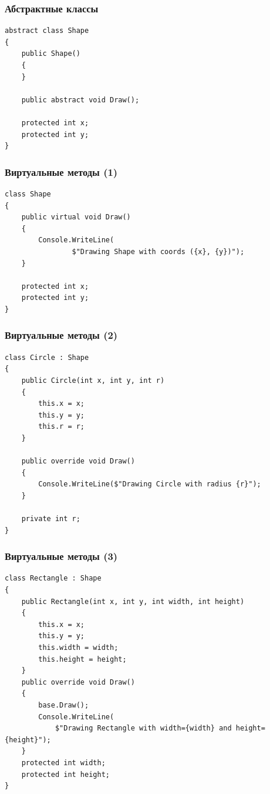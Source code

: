 \documentclass[xetex,mathserif,serif]{beamer}
\begin{document}
    \begin{frame}[fragile]
        \frametitle{Абстрактные классы}
        \begin{verbatim}
abstract class Shape
{
    public Shape() 
    {
    }

    public abstract void Draw();

    protected int x;
    protected int y;
}
        \end{verbatim}
    \end{frame}

    \begin{frame}[fragile]
        \frametitle{Виртуальные методы (1)}
        \begin{verbatim}
class Shape
{
    public virtual void Draw()
    {
        Console.WriteLine(
                $"Drawing Shape with coords ({x}, {y})");
    }

    protected int x;
    protected int y;
}
        \end{verbatim}
    \end{frame}

    \begin{frame}[fragile]
        \frametitle{Виртуальные методы (2)}
        \begin{verbatim}
class Circle : Shape
{
    public Circle(int x, int y, int r)
    {
        this.x = x;
        this.y = y;
        this.r = r;
    }

    public override void Draw()
    {
        Console.WriteLine($"Drawing Circle with radius {r}");
    }

    private int r;
}
        \end{verbatim}
    \end{frame}

    \begin{frame}[fragile]
        \frametitle{Виртуальные методы (3)}
        \begin{footnotesize}
            \begin{verbatim}
class Rectangle : Shape
{
    public Rectangle(int x, int y, int width, int height)
    {
        this.x = x;
        this.y = y;
        this.width = width;
        this.height = height;
    }
    public override void Draw()
    {
        base.Draw();
        Console.WriteLine(
            $"Drawing Rectangle with width={width} and height={height}");
    }
    protected int width;
    protected int height;
}
            \end{verbatim}
        \end{footnotesize}
    \end{frame}
\end{document}

